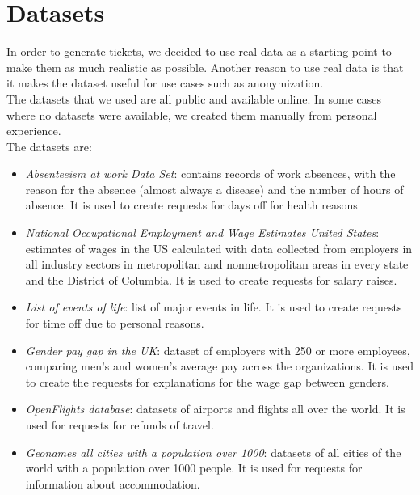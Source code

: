 \section{Datasets}
In order to generate tickets, we decided to use real data as a starting point to make them as much realistic as possible. Another reason to use real data is that it makes the dataset useful for use cases such as anonymization. \\
The datasets that we used are all public and available online. In some cases where no datasets were available, we created them manually from personal experience. \\
The datasets are:
\begin{itemize}
    \item \textit{Absenteeism at work Data Set}: contains records of work absences, with the reason for the absence (almost always a disease) and the number of hours of absence. It is used to create requests for days off for health reasons
    \item \textit{National Occupational Employment and Wage Estimates United States}: estimates of wages in the US calculated with data collected from employers in all industry sectors in metropolitan and nonmetropolitan areas in every state and the District of Columbia. It is used to create requests for salary raises.
    \item \textit{List of events of life}: list of major events in life. It is used to create requests for time off due to personal reasons. 
    \item \textit{Gender pay gap in the UK}: dataset of employers with 250 or more employees, comparing men's and women’s average pay across the organizations. It is used to create the requests for explanations for the wage gap between genders.
    \item \textit{OpenFlights database}: datasets of airports and flights all over the world. It is used for requests for refunds of travel.
    \item \textit{Geonames all cities with a population over 1000}: datasets of all cities of the world with a population over 1000 people. It is used for requests for information about accommodation.
\end{itemize}